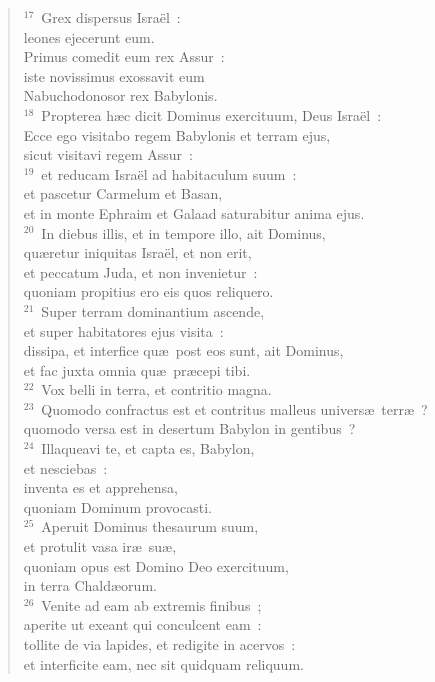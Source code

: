 \begin{flushleft}
\begin{verse}
${}^{17}$~Grex dispersus Isra\"el~:\\ leones ejecerunt eum.\\ Primus comedit eum rex Assur~:\\ iste novissimus exossavit eum\\ Nabuchodonosor rex Babylonis.\\
${}^{18}$~Propterea h\ae c dicit Dominus exercituum, Deus Isra\"el~:\\ Ecce ego visitabo regem Babylonis et terram ejus,\\ sicut visitavi regem Assur~:\\
${}^{19}$~et reducam Isra\"el ad habitaculum suum~:\\ et pascetur Carmelum et Basan,\\ et in monte Ephraim et Galaad saturabitur anima ejus.\\
${}^{20}$~In diebus illis, et in tempore illo, ait Dominus,\\ qu\ae retur iniquitas Isra\"el, et non erit,\\ et peccatum Juda, et non invenietur~:\\ quoniam propitius ero eis quos reliquero.\\
${}^{21}$~Super terram dominantium ascende,\\ et super habitatores ejus visita~:\\ dissipa, et interfice qu\ae\ post eos sunt, ait Dominus,\\ et fac juxta omnia qu\ae\ pr\ae cepi tibi.\\
${}^{22}$~Vox belli in terra, et contritio magna.\\
${}^{23}$~Quomodo confractus est et contritus malleus univers\ae\ terr\ae~?\\ quomodo versa est in desertum Babylon in gentibus~?\\
${}^{24}$~Illaqueavi te, et capta es, Babylon,\\ et nesciebas~:\\ inventa es et apprehensa,\\ quoniam Dominum provocasti.\\
${}^{25}$~Aperuit Dominus thesaurum suum,\\ et protulit vasa ir\ae\ su\ae ,\\ quoniam opus est Domino Deo exercituum,\\ in terra Chald\ae orum.\\
${}^{26}$~Venite ad eam ab extremis finibus~;\\ aperite ut exeant qui conculcent eam~:\\ tollite de via lapides, et redigite in acervos~:\\ et interficite eam, nec sit quidquam reliquum.\\

\end{verse}
\end{flushleft}
